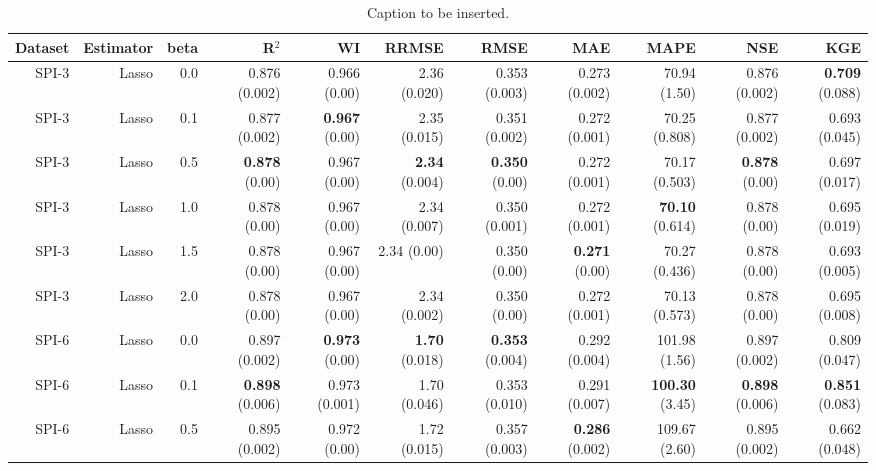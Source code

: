\begin{table}
\centering
\caption{Caption to be inserted.}
\label{sp__comparison_datasets_table}
\begin{tabular}{rrrrrrrrrrr}
\toprule
Dataset & Estimator &  beta &                R$^2$ &                  WI &               RRMSE &                 RMSE &                  MAE &                  MAPE &                  NSE &                  KGE \\
\midrule
  SPI-3 &     Lasso &   0.0 &        0.876 (0.002) &        0.966 (0.00) &        2.36 (0.020) &        0.353 (0.003) &        0.273 (0.002) &          70.94 (1.50) &        0.876 (0.002) & { \bf 0.709} (0.088) \\
  SPI-3 &     Lasso &   0.1 &        0.877 (0.002) & { \bf 0.967} (0.00) &        2.35 (0.015) &        0.351 (0.002) &        0.272 (0.001) &         70.25 (0.808) &        0.877 (0.002) &        0.693 (0.045) \\
  SPI-3 &     Lasso &   0.5 &  { \bf 0.878} (0.00) &        0.967 (0.00) & { \bf 2.34} (0.004) &  { \bf 0.350} (0.00) &        0.272 (0.001) &         70.17 (0.503) &  { \bf 0.878} (0.00) &        0.697 (0.017) \\
  SPI-3 &     Lasso &   1.0 &         0.878 (0.00) &        0.967 (0.00) &        2.34 (0.007) &        0.350 (0.001) &        0.272 (0.001) &  { \bf 70.10} (0.614) &         0.878 (0.00) &        0.695 (0.019) \\
  SPI-3 &     Lasso &   1.5 &         0.878 (0.00) &        0.967 (0.00) &         2.34 (0.00) &         0.350 (0.00) &  { \bf 0.271} (0.00) &         70.27 (0.436) &         0.878 (0.00) &        0.693 (0.005) \\
  SPI-3 &     Lasso &   2.0 &         0.878 (0.00) &        0.967 (0.00) &        2.34 (0.002) &         0.350 (0.00) &        0.272 (0.001) &         70.13 (0.573) &         0.878 (0.00) &        0.695 (0.008) \\
  SPI-6 &     Lasso &   0.0 &        0.897 (0.002) & { \bf 0.973} (0.00) & { \bf 1.70} (0.018) & { \bf 0.353} (0.004) &        0.292 (0.004) &         101.98 (1.56) &        0.897 (0.002) &        0.809 (0.047) \\
  SPI-6 &     Lasso &   0.1 & { \bf 0.898} (0.006) &       0.973 (0.001) &        1.70 (0.046) &        0.353 (0.010) &        0.291 (0.007) &  { \bf 100.30} (3.45) & { \bf 0.898} (0.006) & { \bf 0.851} (0.083) \\
  SPI-6 &     Lasso &   0.5 &        0.895 (0.002) &        0.972 (0.00) &        1.72 (0.015) &        0.357 (0.003) & { \bf 0.286} (0.002) &         109.67 (2.60) &        0.895 (0.002) &        0.662 (0.048) \\

\end{tabular}
\end{table}
